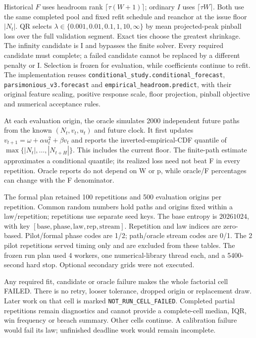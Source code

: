 Historical $F$ uses headroom rank $\lceil\tau(W+1)\rceil$; ordinary $I$ uses $\lceil\tau W\rceil$. Both use the same completed pool and fixed refit schedule and reanchor at the issue floor $|N_t|$. QR selects $\lambda\in\{0.001,0.01,0.1,1,10,\infty\}$ by mean projected-peak pinball loss over the full validation segment. Exact ties choose the greatest shrinkage. The infinity candidate is I and bypasses the finite solver. Every required candidate must complete; a failed candidate cannot be replaced by a different penalty or I. Selection is frozen for evaluation, while coefficients continue to refit. The implementation reuses \texttt{conditional\_study.conditional\_forecast}, \texttt{parsimonious\_v3.forecast} and \texttt{empirical\_headroom.predict}, with their original feature scaling, positive response scale, floor projection, pinball objective and numerical acceptance rules.

At each evaluation origin, the oracle simulates 2000 independent future paths from the known $(N_t,v_t,u_t)$ and future clock. It first updates $v_{t+1}=\omega+\alpha u_t^2+\beta v_t$ and reports the inverted-empirical-CDF quantile of $\max\{|N_t|,\ldots,|N_{t+H}|\}$. This includes the current floor. The finite-path estimate approximates a conditional quantile; its realized loss need not beat F in every repetition. Oracle reports do not depend on W or p, while oracle/F percentages can change with the F denominator.

The formal plan retained 100 repetitions and 500 evaluation origins per repetition. Common random numbers hold paths and origins fixed within a law/repetition; repetitions use separate seed keys. The base entropy is $20261024$, with key $[\mathrm{base},\mathrm{phase},\mathrm{law},\mathrm{rep},\mathrm{stream}]$. Repetition and law indices are zero-based. Pilot/formal phase codes are 1/2; path/oracle stream codes are 0/1. The 2 pilot repetitions served timing only and are excluded from these tables. The frozen run plan used 4 workers, one numerical-library thread each, and a 5400-second hard stop. Optional secondary grids were not executed.

Any required fit, candidate or oracle failure makes the whole factorial cell FAILED. There is no retry, looser tolerance, dropped origin or replacement draw. Later work on that cell is marked \texttt{NOT\_RUN\_CELL\_FAILED}. Completed partial repetitions remain diagnostics and cannot provide a complete-cell median, IQR, win frequency or breach summary. Other cells continue. A calibration failure would fail its law; unfinished deadline work would remain incomplete.

